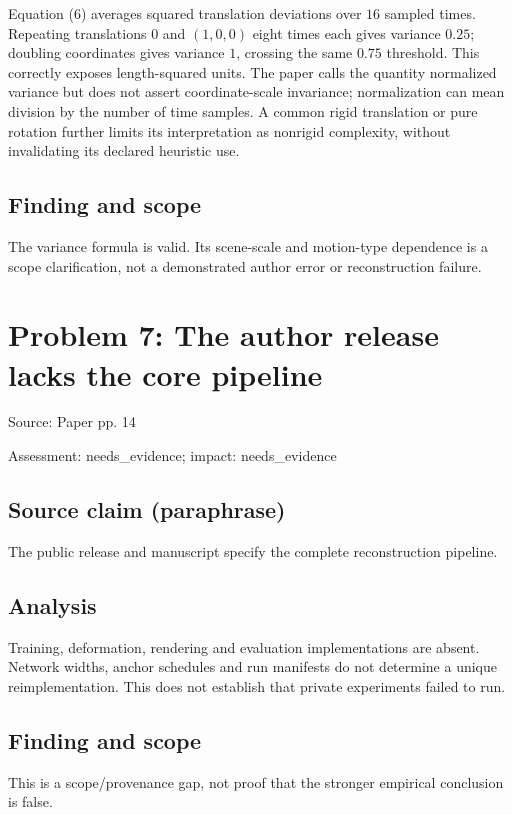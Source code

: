 \documentclass[11pt]{article}
\begin{document}
Equation (6) averages squared translation deviations over \(16\) sampled times. Repeating translations \(0\) and \((1,0,0)\) eight times each gives variance \(0.25\); doubling coordinates gives variance \(1\), crossing the same \(0.75\) threshold. This correctly exposes length-squared units. The paper calls the quantity normalized variance but does not assert coordinate-scale invariance; normalization can mean division by the number of time samples. A common rigid translation or pure rotation further limits its interpretation as nonrigid complexity, without invalidating its declared heuristic use.

\subsection*{Finding and scope}

The variance formula is valid. Its scene-scale and motion-type dependence is a scope clarification, not a demonstrated author error or reconstruction failure.

\section*{Problem 7: The author release lacks the core pipeline}

Source: Paper pp. 14

Assessment: needs\_evidence; impact: needs\_evidence

\subsection*{Source claim (paraphrase)}

The public release and manuscript specify the complete reconstruction pipeline.

\subsection*{Analysis}

Training, deformation, rendering and evaluation implementations are absent. Network widths, anchor schedules and run manifests do not determine a unique reimplementation. This does not establish that private experiments failed to run.

\subsection*{Finding and scope}

This is a scope/provenance gap, not proof that the stronger empirical conclusion is false.
\end{document}
